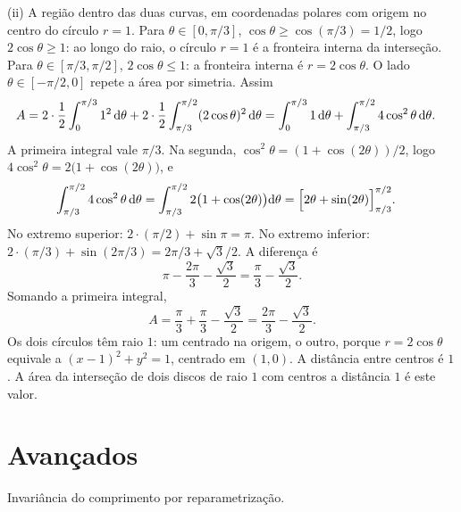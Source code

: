 \documentclass[11pt,a4paper]{article}
\begin{document}
(ii) A região dentro das duas curvas, em coordenadas polares com origem no centro do círculo \(r=1\). Para \(\theta\in[0,\pi/3]\), \(\cos\theta\ge\cos(\pi/3)=1/2\), logo \(2\cos\theta\ge 1\): ao longo do raio, o círculo \(r=1\) é a fronteira interna da interseção. Para \(\theta\in[\pi/3,\pi/2]\), \(2\cos\theta\le 1\): a fronteira interna é \(r=2\cos\theta\). O lado \(\theta\in[-\pi/2,0]\) repete a área por simetria. Assim
\begin{align*}
A
&=2\cdot\frac12\int_{0}^{\pi/3} 1^{2}\,\mathrm{d}\theta
+2\cdot\frac12\int_{\pi/3}^{\pi/2}(2\cos\theta)^{2}\,\mathrm{d}\theta
=\int_{0}^{\pi/3} 1\,\mathrm{d}\theta
+\int_{\pi/3}^{\pi/2} 4\cos^{2}\theta\,\mathrm{d}\theta.
\end{align*}
A primeira integral vale \(\pi/3\). Na segunda, \(\cos^{2}\theta=(1+\cos(2\theta))/2\), logo \(4\cos^{2}\theta=2\bigl(1+\cos(2\theta)\bigr)\), e
\begin{align*}
\int_{\pi/3}^{\pi/2} 4\cos^{2}\theta\,\mathrm{d}\theta
&=\int_{\pi/3}^{\pi/2} 2\bigl(1+\cos(2\theta)\bigr)\mathrm{d}\theta
=\Bigl[2\theta+\sin(2\theta)\Bigr]_{\pi/3}^{\pi/2}.
\end{align*}
No extremo superior: \(2\cdot(\pi/2)+\sin\pi=\pi\). No extremo inferior: \(2\cdot(\pi/3)+\sin(2\pi/3)=2\pi/3+\sqrt{3}/2\). A diferença é
\[
\pi-\frac{2\pi}{3}-\frac{\sqrt{3}}{2}
=\frac{\pi}{3}-\frac{\sqrt{3}}{2}.
\]
Somando a primeira integral,
\[
A=\frac{\pi}{3}+\frac{\pi}{3}-\frac{\sqrt{3}}{2}
=\frac{2\pi}{3}-\frac{\sqrt{3}}{2}.
\]
Os dois círculos têm raio \(1\): um centrado na origem, o outro, porque \(r=2\cos\theta\) equivale a \((x-1)^{2}+y^{2}=1\), centrado em \((1,0)\). A distância entre centros é \(1\). A área da interseção de dois discos de raio \(1\) com centros a distância \(1\) é este valor.

\section{Avançados}

\begin{exercicio}[Avançado --- A1]
Invariância do comprimento por reparametrização.
\end{exercicio}
\end{document}
